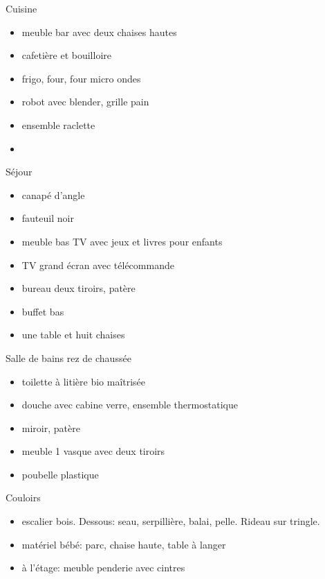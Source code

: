 \documentclass[a4paper,11pt]{article}
\begin{document}
\vspace{0.25cm}

Cuisine
\begin{itemize}
\item meuble bar avec deux chaises hautes 
\item cafetière et bouilloire
\item frigo, four, four micro ondes
\item robot avec blender, grille pain
\item ensemble raclette
\item 
\end{itemize}

\vspace{0.25cm}

Séjour
\begin{itemize}
\item canapé d'angle
\item fauteuil noir
\item meuble bas TV avec jeux et livres pour enfants
\item TV grand écran avec télécommande
\item bureau deux tiroirs, patère
\item buffet bas 
\item une table et huit chaises
\end{itemize}

\vspace{0.25cm}

Salle de bains rez de chaussée
\begin{itemize}
\item toilette à litière bio maîtrisée
\item douche avec cabine verre, ensemble thermostatique
\item miroir, patère
\item meuble 1 vasque avec deux tiroirs
\item poubelle plastique
\end{itemize}

\vspace{0.25cm}
Couloirs
\begin{itemize}
\item escalier bois. Dessous: seau, serpillière, balai, pelle. Rideau sur tringle.
\item matériel bébé: parc, chaise haute, table à langer
\item à l'étage: meuble penderie avec cintres
\end{itemize}
\end{document}
